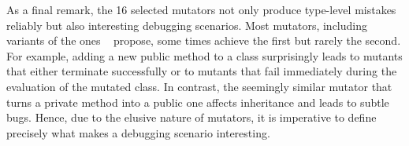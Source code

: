 As a final remark, the 16 selected mutators not only produce  type-level
mistakes  reliably but also interesting debugging scenarios. Most
mutators,  including variants of the ones
~\citet{w:good-types-mutation} propose, some times achieve the first but 
rarely the second. 
 For example,  adding a new public method to
a class surprisingly leads to mutants that either terminate 
successfully or to mutants that fail 
 immediately during the evaluation of the mutated class.  
 In contrast, the seemingly similar mutator that turns a private method into    
 a public one affects inheritance and leads to subtle bugs.  
Hence, due to the elusive nature of mutators, it is imperative to define
precisely what makes a debugging scenario interesting. 
 


